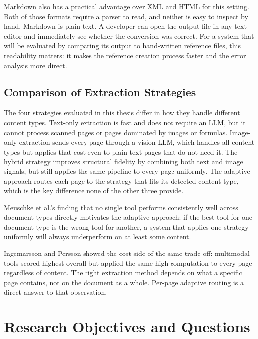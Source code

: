 Markdown also has a practical advantage over XML and HTML for this setting.
Both of those formats require a parser to read, and neither is easy to inspect
by hand. Markdown is plain text. A developer can open the output file in any
text editor and immediately see whether the conversion was correct. For a
system that will be evaluated by comparing its output to hand-written reference
files, this readability matters: it makes the reference creation process
faster and the error analysis more direct.

\subsection{Comparison of Extraction Strategies}

The four strategies evaluated in this thesis differ in how they handle
different content types. Text-only extraction is fast and does not require
an LLM, but it cannot process scanned pages or pages dominated by images
or formulas. Image-only extraction sends every page through a vision LLM,
which handles all content types but applies that cost even to plain-text
pages that do not need it. The hybrid strategy improves structural fidelity
by combining both text and image signals, but still applies the same pipeline
to every page uniformly. The adaptive approach routes each page to the
strategy that fits its detected content type, which is the key difference
none of the other three provide.

Meuschke et al.'s finding that no single tool performs consistently well
across document types \autocite{meuschke2023} directly motivates the
adaptive approach: if the best tool for one
document type is the wrong tool for another, a system that applies one strategy
uniformly will always underperform on at least some content.

Ingemarsson and Persson \autocite{ingemarsson2024} showed the cost side of the
same trade-off: multimodal tools scored highest overall but applied the same
high computation to every page regardless of content. The right extraction
method depends on what a specific page contains, not on the document as a
whole. Per-page adaptive routing is a direct answer to that observation.

\section{Research Objectives and Questions}

